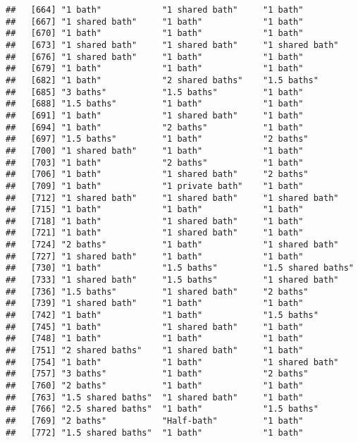 \documentclass[
]{article}
\begin{document}
\begin{verbatim}
##   [664] "1 bath"            "1 shared bath"     "1 bath"           
##   [667] "1 shared bath"     "1 bath"            "1 bath"           
##   [670] "1 bath"            "1 bath"            "1 bath"           
##   [673] "1 shared bath"     "1 shared bath"     "1 shared bath"    
##   [676] "1 shared bath"     "1 bath"            "1 bath"           
##   [679] "1 bath"            "1 bath"            "1 bath"           
##   [682] "1 bath"            "2 shared baths"    "1.5 baths"        
##   [685] "3 baths"           "1.5 baths"         "1 bath"           
##   [688] "1.5 baths"         "1 bath"            "1 bath"           
##   [691] "1 bath"            "1 shared bath"     "1 bath"           
##   [694] "1 bath"            "2 baths"           "1 bath"           
##   [697] "1.5 baths"         "1 bath"            "2 baths"          
##   [700] "1 shared bath"     "1 bath"            "1 bath"           
##   [703] "1 bath"            "2 baths"           "1 bath"           
##   [706] "1 bath"            "1 shared bath"     "2 baths"          
##   [709] "1 bath"            "1 private bath"    "1 bath"           
##   [712] "1 shared bath"     "1 shared bath"     "1 shared bath"    
##   [715] "1 bath"            "1 bath"            "1 bath"           
##   [718] "1 bath"            "1 shared bath"     "1 bath"           
##   [721] "1 bath"            "1 shared bath"     "1 bath"           
##   [724] "2 baths"           "1 bath"            "1 shared bath"    
##   [727] "1 shared bath"     "1 bath"            "1 bath"           
##   [730] "1 bath"            "1.5 baths"         "1.5 shared baths" 
##   [733] "1 shared bath"     "1.5 baths"         "1 shared bath"    
##   [736] "1.5 baths"         "1 shared bath"     "2 baths"          
##   [739] "1 shared bath"     "1 bath"            "1 bath"           
##   [742] "1 bath"            "1 bath"            "1.5 baths"        
##   [745] "1 bath"            "1 shared bath"     "1 bath"           
##   [748] "1 bath"            "1 bath"            "1 bath"           
##   [751] "2 shared baths"    "1 shared bath"     "1 bath"           
##   [754] "1 bath"            "1 bath"            "1 shared bath"    
##   [757] "3 baths"           "1 bath"            "2 baths"          
##   [760] "2 baths"           "1 bath"            "1 bath"           
##   [763] "1.5 shared baths"  "1 shared bath"     "1 bath"           
##   [766] "2.5 shared baths"  "1 bath"            "1.5 baths"        
##   [769] "2 baths"           "Half-bath"         "1 bath"           
##   [772] "1.5 shared baths"  "1 bath"            "1 bath"           

\end{verbatim}
\end{document}
